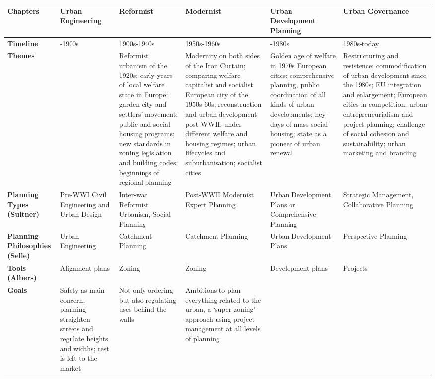 \documentclass{article}
\begin{document}
{
\begin{tabularx}{1.15\textwidth} { 
  | >{\raggedright\arraybackslash}X
  | >{\raggedright\arraybackslash}X 
  | >{\raggedright\arraybackslash}X 
  | >{\raggedright\arraybackslash}X
  | >{\raggedright\arraybackslash}X 
  | >{\raggedright\arraybackslash}X | }
  \hline
  Chapters
  & \textbf{Urban Engineering}
   & \textbf{Reformist} 
   & \textbf{Modernist} 
   & \textbf{Urban Development Planning}
   & \textbf{Urban Governance} \\
  \hline
  \textbf{Timeline}
  & 1860-1900s
  & 1900s-1940s
  & 1950s-1960s
  & 1960-1980s
  & 1980s-today \\ 
  \hline
  \textbf{Themes}
  & 
   & Reformist urbanism of the 1920s; early years of local welfare state in Europe; garden city and settlers' movement; public and social housing programs; new standards in zoning legislation and building codes; beginnings of regional planning 
   & Modernity on both sides of the Iron Curtain; comparing welfare capitalist and socialist European city of the 1950s-60s; reconstruction and urban development post-WWII, under different welfare and housing regimes; urban lifecycles and suburbanisation; socialist cities
   & Golden age of welfare in 1970s European cities; comprehensive planning, public coordination of all kinds of urban developments; hey-days of mass social housing; state as a pioneer of urban renewal
   & Restructuring and resistence; commodification of urban development since the 1980s; EU integration and enlargement; European cities in competition; urban entrepreneurialism and project planning; challenge of social cohesion and sustainability; urban marketing and branding \\
  \hline
  \textbf{Planning Types (Suitner)}
  & Pre-WWI Civil Engineering and Urban Design
   & Inter-war Reformist Urbanism, Social Planning
   & Post-WWII Modernist Expert Planning
   & Urban Development Plans or Comprehensive Planning
   & Strategic Management, Collaborative Planning \\
  \hline
  \textbf{Planning Philosophies (Selle)}
   & Urban Engineering
   & Catchment Planning
   & Catchment Planning
   & Urban Development Plans
   & Perspective Planning \\
      \hline
  \textbf{Tools (Albers)}
  & Alignment plans
  & Zoning
  & Zoning
  & Development plans
  & Projects \\
      \hline
  \textbf{Goals}
  & Safety as main concern, planning straighten streets and regulate heights and widths; rest is left to the market
  & Not only ordering but also regulating uses behind the walls
  & Ambitions to plan everything related to the urban, a `super-zoning' approach using project management at all levels of planning
  & 
  &  \\
   \hline
\end{tabularx}}
\end{document}
